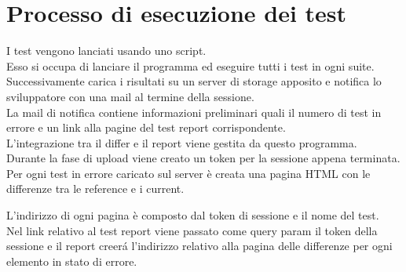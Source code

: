     \section{Processo di esecuzione dei test\label{testexecution}}
        I test vengono lanciati usando uno script.\\
        Esso si occupa di lanciare il programma ed eseguire tutti i test in ogni suite.\\
        Successivamente carica i risultati su un server di storage apposito e notifica lo sviluppatore con una mail al termine della sessione.\\

        La mail di notifica contiene informazioni preliminari quali il numero di test in errore e un link alla pagine del test report corrispondente.\\

        L'integrazione tra il differ e il report viene gestita da questo programma.\\
        Durante la fase di upload viene creato un token per la sessione appena terminata.\\
        Per ogni test in errore caricato sul server è creata una pagina HTML con le differenze tra le reference e i current.
        
        L'indirizzo di ogni pagina è composto dal token di sessione e il nome del test.\\
        Nel link relativo al test report viene passato come query param il token della sessione e il report creer\'a l'indirizzo relativo alla pagina delle differenze per ogni elemento in stato di errore.
